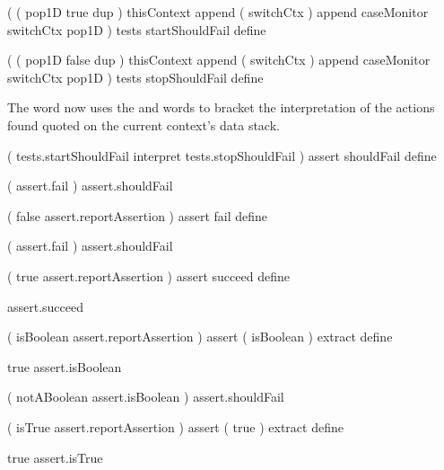 \startJoylolCode
(
  (
    pop1D
    true
    dup
  ) 
  thisContext
  append
  ( switchCtx )
  append
  caseMonitor
  switchCtx
  pop1D
)
tests
startShouldFail
define 
\stopJoylolCode 

\startJoylolCode
(
  (
    pop1D
    false
    dup
  )
  thisContext
  append
  ( switchCtx )
  append
  caseMonitor
  switchCtx
  pop1D
)
tests
stopShouldFail
define
\stopJoylolCode

The  word now uses the 
 and  words to 
bracket the interpretation of the actions found quoted on the current 
context's data stack. 

\startJoylolCode
(
  tests.startShouldFail
  interpret
  tests.stopShouldFail
)
assert
shouldFail
define
\stopJoylolCode

\startJoylolTest
( assert.fail ) assert.shouldFail
\stopJoylolTest
\stopTestCase
\stopTestSuite


\startJoylolCode
(
  false
  assert.reportAssertion
)
assert
fail
define
\stopJoylolCode

\startJoylolTest
( assert.fail ) assert.shouldFail
\stopJoylolTest
\stopTestCase
\stopTestSuite

\startJoylolCode
(
  true
  assert.reportAssertion
)
assert
succeed
define
\stopJoylolCode

\startJoylolTest
assert.succeed
\stopJoylolTest
\stopTestCase
\stopTestSuite

\startJoylolCode
(
  isBoolean
  assert.reportAssertion
)
assert
( isBoolean ) extract
define
\stopJoylolCode

\startJoylolTest
true
assert.isBoolean
\stopJoylolTest
\stopTestCase

\startJoylolTest
(
  notABoolean
  assert.isBoolean
) assert.shouldFail
\stopJoylolTest
\stopTestCase
\stopTestSuite


\startJoylolCode
(
  isTrue
  assert.reportAssertion
)
assert
( true ) extract
define
\stopJoylolCode

\startJoylolTest
true
assert.isTrue

